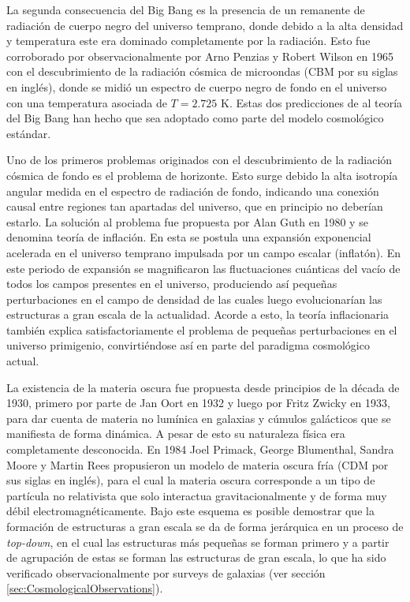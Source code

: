 La segunda consecuencia del Big Bang es la presencia de un remanente de 
radiación de cuerpo negro del universo temprano, donde debido a la alta 
densidad y temperatura este era dominado completamente por la radiación.
Esto fue corroborado por observacionalmente por Arno Penzias y Robert
Wilson en 1965 con el descubrimiento de la radiación cósmica de microondas
(CBM por su siglas en inglés), donde se midió un espectro de cuerpo negro
de fondo en el universo con una temperatura asociada de $T = 2.725$ K. 
Estas dos predicciones de al teoría del Big Bang han hecho que sea 
adoptado como parte del modelo cosmológico estándar.


Uno de los primeros problemas originados con el descubrimiento de la 
radiación cósmica de fondo es el problema de horizonte. Esto surge debido
la alta isotropía angular medida en el espectro de radiación de fondo, 
indicando una conexión causal entre regiones tan apartadas del universo, 
que en principio no deberían estarlo. La solución al problema fue propuesta 
por Alan Guth en 1980 y se denomina teoría de inflación. En esta se postula 
una expansión exponencial acelerada en el universo temprano impulsada por 
un campo escalar (inflatón). En este periodo de expansión se magnificaron 
las fluctuaciones cuánticas del vacío de todos los campos presentes en el 
universo, produciendo así pequeñas perturbaciones en el campo de densidad 
de las cuales luego evolucionarían las estructuras a gran escala de la 
actualidad. Acorde a esto, la teoría inflacionaria también explica 
satisfactoriamente el problema de pequeñas perturbaciones en el universo 
primigenio, convirtiéndose así en parte del paradigma cosmológico actual.


La existencia de la materia oscura fue propuesta desde principios de la 
década de 1930, primero por parte de Jan Oort en 1932 y luego por Fritz
Zwicky en 1933, para dar cuenta de materia no lumínica en galaxias y 
cúmulos galácticos que se manifiesta de forma dinámica. A pesar de esto 
su naturaleza física era completamente desconocida. En 1984 Joel Primack,
George Blumenthal, Sandra Moore y Martin Rees propusieron un modelo de 
materia oscura fría (CDM por sus siglas en inglés), para el cual la 
materia oscura corresponde a un tipo de partícula no relativista que solo
interactua gravitacionalmente y de forma muy débil electromagnéticamente.
Bajo este esquema es posible demostrar que la formación de estructuras a 
gran escala se da de forma jerárquica en un proceso de \textit{top-down},
en el cual las estructuras más pequeñas se forman primero y a partir de 
agrupación de estas se forman las estructuras de gran escala, lo que ha sido
verificado observacionalmente por surveys de galaxias (ver sección
\ref{sec:CosmologicalObservations}).



